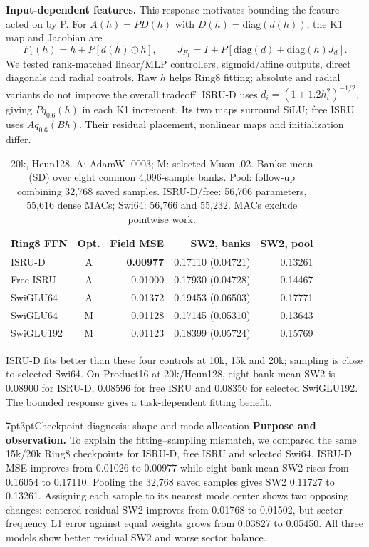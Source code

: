 \documentclass[11pt]{article}
\makeatletter
\renewcommand\section{\@startsection{section}{1}{\z@}%
 {7pt\@plus2pt\@minus2pt}{3pt}{\normalfont\large\bfseries}}
\makeatother
\begin{document}
\textbf{Input-dependent features.} This response motivates bounding the feature
acted on by P. For $A(h)=PD(h)$ with $D(h)=\mathrm{diag}(d(h))$, the K1 map and Jacobian are
\begin{equation}
F_1(h)=h+P[d(h)\odot h],\qquad
J_{F_1}=I+P[\mathrm{diag}(d)+\mathrm{diag}(h)J_d].
\end{equation}
We tested rank-matched linear/MLP controllers, sigmoid/affine outputs, direct
diagonals and radial controls. Raw $h$ helps Ring8 fitting; absolute and radial
variants do not improve the overall tradeoff. ISRU-D uses
$d_i=(1+1.2h_i^2)^{-1/2}$, giving $Pq_{0.6}(h)$ in each K1 increment. Its two
maps surround SiLU; free ISRU uses $Aq_{0.6}(Bh)$. Their residual placement,
nonlinear maps and initialization differ.
\begin{table}[H]
\centering\small
\begin{tabular}{@{}lcrrr@{}}
\toprule
Ring8 FFN & Opt. & Field MSE & SW2, banks & SW2, pool\\
\midrule
ISRU-D & A & \textbf{0.00977} & 0.17110 (0.04721) & 0.13261\\
Free ISRU & A & 0.01000 & 0.17930 (0.04728) & 0.14467\\
SwiGLU64 & A & 0.01372 & 0.19453 (0.06503) & 0.17771\\
SwiGLU64 & M & 0.01128 & 0.17145 (0.05310) & 0.13643\\
SwiGLU192 & M & 0.01123 & 0.18399 (0.05724) & 0.15769\\
\bottomrule
\end{tabular}
\caption{20k, Heun128. A: AdamW .0003; M: selected Muon .02. Banks: mean (SD)
over eight common 4,096-sample banks. Pool: follow-up combining 32,768 saved
samples. ISRU-D/free: 56,706 parameters, 55,616 dense MACs; Swi64: 56,766 and
55,232. MACs exclude pointwise work.}
\end{table}
\vspace{-0.5em}
ISRU-D fits better than these four controls at 10k, 15k and 20k; sampling is
close to selected Swi64. On Product16 at 20k/Heun128, eight-bank mean SW2 is
0.08900 for ISRU-D, 0.08596 for free ISRU and 0.08350 for selected SwiGLU192.
The bounded response gives a task-dependent fitting benefit.

\newpage
\section{Checkpoint diagnosis: shape and mode allocation}
\textbf{Purpose and observation.} To explain the fitting--sampling mismatch,
we compared the same 15k/20k Ring8 checkpoints for ISRU-D, free ISRU and
selected Swi64. ISRU-D MSE improves from 0.01026 to 0.00977 while eight-bank
mean SW2 rises from 0.16054 to 0.17110. Pooling the 32,768 saved samples gives
SW2 0.11727 to 0.13261. Assigning each sample to its nearest mode center shows
two opposing changes: centered-residual SW2 improves from 0.01768 to 0.01502,
but sector-frequency L1 error against equal weights grows from 0.03827 to
0.05450. All three models show better residual SW2 and worse sector balance.
\end{document}
